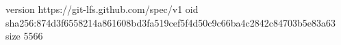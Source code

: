 version https://git-lfs.github.com/spec/v1
oid sha256:874d3f6558214a861608bd3fa519cef5f4d50c9c66ba4c2842c84703b5e83a63
size 5566
